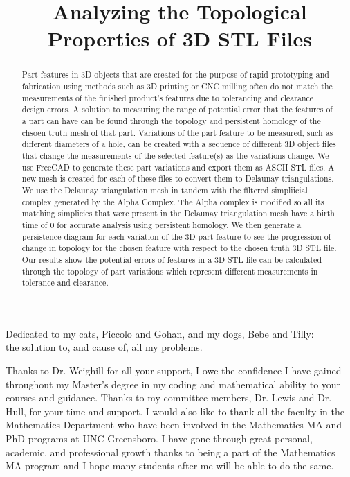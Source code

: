 \documentclass[ma]{uncgdissertationexp}
\title{Analyzing the Topological Properties of 3D STL Files}
\theoremstyle{plain}
\theoremstyle{definition}
\theoremstyle{remark}
\begin{document}
\frontmatter      %
\begin{abstract}
Part features in 3D objects that are created for the purpose of rapid prototyping and fabrication using methods such as 3D printing or CNC milling often do not match the measurements of the finished product's features due to tolerancing and clearance design errors. A solution to measuring the range of potential error that the features of a part can have can be found through the topology and persistent homology of the chsoen truth mesh of that part. Variations of the part feature to be measured, such as different diameters of a hole, can be created with a sequence of different 3D object files that change the measurements of the selected feature(s) as the variations change. We use FreeCAD to generate these part variations and export them as ASCII STL files. A new mesh is created for each of these files to convert them to Delaunay triangulations. We use the Delaunay triangulation mesh in tandem with the filtered simpliicial complex generated by the Alpha Complex. The Alpha complex is modified so all its matching simplicies that were present in the Delaunay triangulation mesh have a birth time of 0 for accurate analysis using persistent homology. We then generate a persistence diagram for each variation of the 3D part feature to see the progression of change in topology for the chosen feature with respect to the chosen truth 3D STL file. Our results show the potential errors of features in a 3D STL file can be calculated through the topology of part variations which represent different measurements in tolerance and clearance.
\end{abstract}
\maketitlepage  
\makecopyrightpage
\begin{dedication}
Dedicated to my cats, Piccolo and Gohan, and my dogs, Bebe and Tilly:\\
the solution to, and cause of, all my problems.
\end{dedication}
\makeapprovalpage
\begin{acknowledgments}
\par Thanks to Dr. Weighill for all your support, I owe the confidence I have gained throughout my Master's degree in my coding and mathematical ability to your courses and guidance. Thanks to my committee members, Dr. Lewis and Dr. Hull, for your time and support. I would also like to thank all the faculty in the Mathematics Department who have been involved in the Mathematics MA and PhD programs at UNC Greensboro. I have gone through great personal, academic, and professional growth thanks to being a part of the Mathematics MA program and I hope many students after me will be able to do the same.
\end{acknowledgments}
\tableofcontents
\listoffigures
\mainmatter
\end{document}

